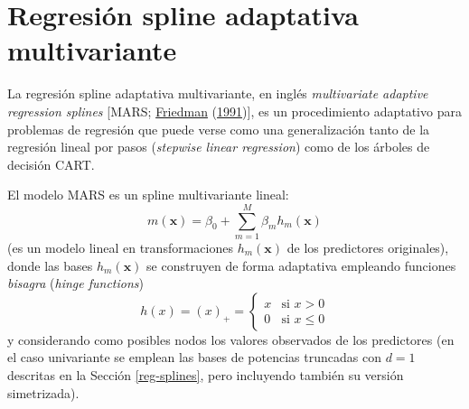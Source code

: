 \documentclass[
  spanish,
]{book}
\theoremstyle{break}
\theoremstyle{definition}
\theoremstyle{definition}
\theoremstyle{definition}
\theoremstyle{definition}
\theoremstyle{remark}
\begin{document}
\hypertarget{mars}{%
\section{Regresión spline adaptativa multivariante}\label{mars}}

La regresión spline adaptativa multivariante, en inglés \emph{multivariate adaptive regression splines} {[}MARS; \protect\hyperlink{ref-friedman1991multivariate}{Friedman} (\protect\hyperlink{ref-friedman1991multivariate}{1991}){]}, es un procedimiento adaptativo para problemas de regresión que puede verse como una generalización tanto de la regresión lineal por pasos (\emph{stepwise linear regression}) como de los árboles de decisión CART.

El modelo MARS es un spline multivariante lineal:\\
\[m(\mathbf{x}) = \beta_0 + \sum_{m=1}^M \beta_m h_m(\mathbf{x})\]
(es un modelo lineal en transformaciones \(h_m(\mathbf{x})\) de los predictores originales), donde las bases \(h_m(\mathbf{x})\) se construyen de forma adaptativa empleando funciones \emph{bisagra} (\emph{hinge functions})
\[ h(x) = (x)_+ = \left\{ \begin{array}{ll}
  x & \mbox{si } x > 0 \\
  0 & \mbox{si } x \leq 0
  \end{array}
  \right.\]
y considerando como posibles nodos los valores observados de los predictores
(en el caso univariante se emplean las bases de potencias truncadas con \(d=1\) descritas en la Sección \ref{reg-splines}, pero incluyendo también su versión simetrizada).
\end{document}

